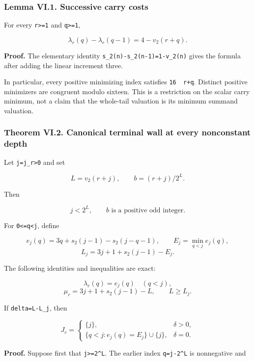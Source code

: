 \documentclass[11pt,letterpaper]{article}
\begin{document}
\subsubsection{Lemma VI.1. Successive carry costs}\label{lemma-vi.1.-successive-carry-costs}

For every \texttt{r\textgreater{}=1} and \texttt{q\textgreater{}=1},

\[
\boxed{\lambda_r(q)-\lambda_r(q-1)=4-v_2(r+q).} \tag{VI.4}
\]

\textbf{Proof.} The elementary identity \texttt{s\_2(n)-s\_2(n-1)=1-v\_2(n)} gives the formula after adding the linear increment three.

In particular, every positive minimizing index satisfies \texttt{16\ \textbar{}\ r+q}. Distinct positive minimizers are congruent modulo sixteen. This is a restriction on the scalar carry minimum, not a claim that the whole-tail valuation is its minimum summand valuation.

\subsubsection{Theorem VI.2. Canonical terminal wall at every nonconstant depth}\label{theorem-vi.2.-canonical-terminal-wall-at-every-nonconstant-depth}

Let \texttt{j=j\_r\textgreater{}0} and set

\[
L=v_2(r+j),\qquad b=(r+j)/2^L.
\]

Then

\[
\boxed{j<2^L,\qquad b\text{ is a positive odd integer}.} \tag{VI.5}
\]

For \texttt{0\textless{}=q\textless{}j}, define

\[
e_j(q)=3q+s_2(j-1)-s_2(j-q-1),\qquad
E_j=\min_{q<j}e_j(q),
\] \[
L_j=3j+1+s_2(j-1)-E_j.
\]

The following identities and inequalities are exact:

\[
\lambda_r(q)=e_j(q)\quad(q<j),
\] \[
\boxed{\mu_r=3j+1+s_2(j-1)-L,\qquad L\ge L_j.} \tag{VI.6}
\]

If \texttt{delta=L-L\_j}, then

\[
J_r=
\begin{cases}
\{j\},&\delta>0,\\
\{q<j:e_j(q)=E_j\}\cup\{j\},&\delta=0.
\end{cases} \tag{VI.7}
\]

\textbf{Proof.} Suppose first that \texttt{j\textgreater{}=2\^{}L}. The earlier index \texttt{q=j-2\^{}L} is nonnegative and
\end{document}
